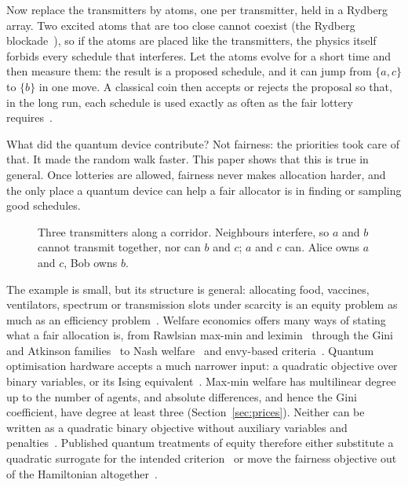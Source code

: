 \documentclass[11pt,a4paper]{article}
\begin{document}
Now replace the transmitters by atoms, one per transmitter, held in a Rydberg array. Two excited atoms
that are too close cannot coexist (the Rydberg blockade~\cite{jaksch2000fast,bernien2017probing}), so if
the atoms are placed like the transmitters, the physics itself forbids every schedule that interferes.
Let the atoms evolve for a short time and then measure them: the result is a proposed schedule, and it
can jump from $\{a,c\}$ to $\{b\}$ in one move. A classical coin then accepts or rejects the proposal so
that, in the long run, each schedule is used exactly as often as the fair lottery
requires~\cite{metropolis1953equation,layden2023quantum}.

What did the quantum device contribute? Not fairness: the priorities took care of that. It made the
random walk faster. This paper shows that this is true in general. Once lotteries are allowed,
fairness never makes allocation harder, and the only place a quantum device can help a fair
allocator is in finding or sampling good schedules.

\begin{figure}[t]
\centering
{}
\caption{Three transmitters along a corridor. Neighbours interfere, so $a$ and $b$ cannot transmit
together, nor can $b$ and $c$; $a$ and $c$ can. Alice owns $a$ and $c$, Bob owns $b$.}
\label{fig:story}
\end{figure}

The example is small, but its structure is general: allocating food, vaccines, ventilators, spectrum or transmission slots under scarcity is an equity
problem as much as an efficiency problem~\cite{moulin2003fair,brandt2016handbook,pathak2024fair,bertsimas2011price}.
Welfare economics offers many ways of stating what a fair allocation is, from Rawlsian max-min and
leximin~\cite{rawls1971theory} through the Gini and Atkinson families~\cite{atkinson1970measurement,sen1973economic,weymark1981generalized}
to Nash welfare~\cite{nash1950bargaining,kaneko1979nash} and envy-based
criteria~\cite{foley1967resource,varian1974equity}. Quantum optimisation hardware accepts a much
narrower input: a quadratic objective over binary variables, or its Ising
equivalent~\cite{lucas2014ising,kadowaki1998quantum,farhi2014quantum}. Max-min welfare has
multilinear degree up to the number of agents, and absolute differences, and hence the Gini
coefficient, have degree at least three (Section~\ref{sec:prices}). Neither can be written as a
quadratic binary objective without auxiliary variables and penalties~\cite{boros2002pseudo}.
Published quantum treatments of equity therefore either substitute a quadratic surrogate for the
intended criterion~\cite{udekwe2025qrestore} or move the fairness objective out of the Hamiltonian
altogether~\cite{bach2026learning}.
\end{document}
